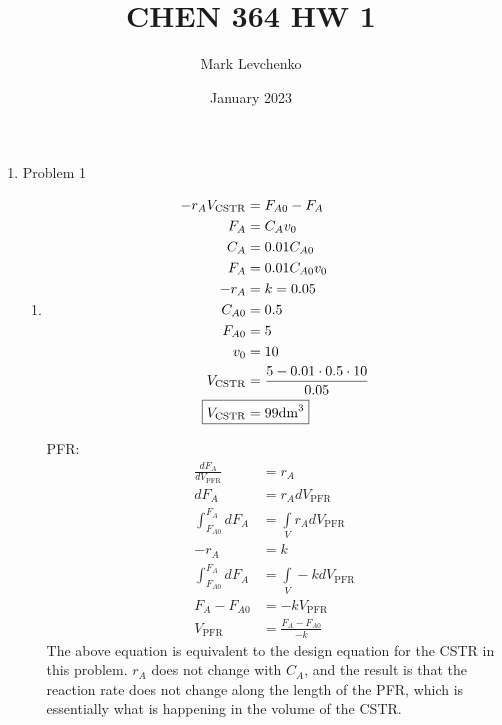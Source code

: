 \documentclass[12pt]{article}
\title{CHEN 364 HW 1}
\author{Mark Levchenko}
\date{January 2023}
\begin{document}
\maketitle

\begin{enumerate}

    \item Problem 1
    \begin{enumerate}
        \item 
        \begin{align*}
            -r_A V_{\mathrm{CSTR}} &= F_{A0} - F_A \\
            F_A &= C_A v_0 \\
            C_A &= 0.01 C_{A0} \\
            F_A &= 0.01 C_{A0} v_0 \\
            -r_A &= k = 0.05 \\
            C_{A0} &= 0.5 \\
            F_{A0} &= 5 \\
            v_0 &= 10 \\
            V_{\mathrm{CSTR}} &= \frac{5 - 0.01 \cdot 0.5 \cdot 10}{0.05} \\
            \Aboxed{V_{\mathrm{CSTR}} &= 99 \mathrm{dm}^3}
        \end{align*}

        PFR:
        \begin{align*}
            \frac{dF_A}{dV_{\mathrm{PFR}}} &= r_A \\
            dF_A &= r_A dV_{\mathrm{PFR}} \\ 
            \int^{F_A}_{F_{A0}} dF_A &= \underset{V}{\int} r_A dV_{\mathrm{PFR}} \\ 
            -r_A &= k \\
            \int^{F_A}_{F_{A0}} dF_A &= \underset{V}{\int} -k dV_{\mathrm{PFR}} \\ 
            F_A - F_{A0} &= -k V_{\mathrm{PFR}} \\
            V_{\mathrm{PFR}} &= \frac{F_A - F_{A0}}{-k}
        \end{align*}
        The above equation is equivalent to the design equation for the CSTR in this problem. $r_A$ does not change with $C_A$, and the result is that the reaction rate does not change along the length of the PFR, which is essentially what is happening in the volume of the CSTR.


\end{enumerate}
\end{enumerate}
\end{document}
